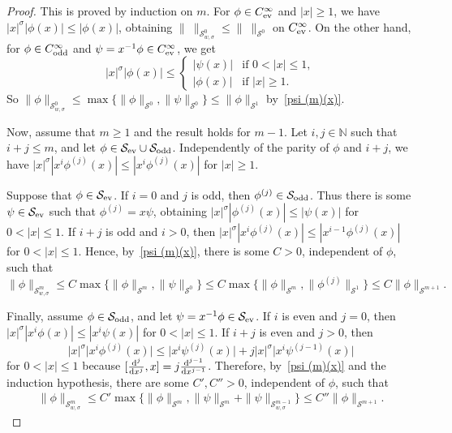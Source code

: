 \documentclass[pdftex]{sigma}
\newcommand{\N}{\mathbb{N}}
\renewcommand{\SS}{\mathcal{S}}
\newcommand{\Cinf}{C^\infty}
\begin{document}
\begin{proof}
  This is proved by induction on $m$. For $\phi\in C^\infty_{\text{\rm ev}}$ and $|x|\ge1$, we have $|x|^\sigma |\phi(x)|\le|\phi(x)|$, obtaining $\|\ \|_{\SS_{w,\sigma}^0}\le\|\ \|_{\SS^0}$ on $\Cinf_{\text{\rm ev}}$. On the other hand, for $\phi\in\Cinf_{\text{\rm odd}}$ and $\psi=x^{-1}\phi\in\Cinf_{\text{\rm ev}}$, we get{\samepage
    \[
      |x|^\sigma|\phi(x)|\le
        \begin{cases}
          |\psi(x)| & \text{if $0<|x|\le1$},\\
          |\phi(x)| & \text{if $|x|\ge1$} .
        \end{cases}
    \]
  So $\|\phi\|_{\SS_{w,\sigma}^0}\le\max\{\|\phi\|_{\SS^0},\|\psi\|_{\SS^0}\}\le\|\phi\|_{\SS^1}$ by~\eqref{psi (m)(x)}.}

  Now, assume that $m\ge1$ and the result holds for $m-1$. Let $i,j\in\N$ such that $i+j\le m$, and let $\phi\in\SS_{\text{\rm ev}}\cup\SS_{\text{\rm odd}}$. Independently of the parity of $\phi$ and $i+j$, we have $|x|^\sigma |x^i\phi^{(j)}(x)|\le|x^i\phi^{(j)}(x)|$ for $|x|\ge1$.

  Suppose that $\phi\in\SS_{\text{\rm ev}}$. If $i=0$ and $j$ is odd, then $\phi^{(j)}\in\SS_{\text{\rm odd}}$. Thus there is some $\psi\in\SS_{\text{\rm ev}}$ such that $\phi^{(j)}=x\psi$, obtaining $|x|^\sigma|\phi^{(j)}(x)|\le|\psi(x)|$ for $0<|x|\le1$. If $i+j$ is odd and $i>0$, then $|x|^\sigma|x^i\phi^{(j)}(x)|\le|x^{i-1}\phi^{(j)}(x)|$ for $0<|x|\le1$. Hence, by~\eqref{psi (m)(x)}, there is some $C>0$, independent of $\phi$, such that
    \[
      \|\phi\|_{\SS_{w,\sigma}^m}\le C\max\{\|\phi\|_{\SS^m},\|\psi\|_{\SS^0}\}\le C\max\bigl\{\|\phi\|_{\SS^m},\|\phi^{(j)}\|_{\SS^1}\bigr\}\le C \|\phi\|_{\SS^{m+1}} .
    \]

  Finally, assume $\phi\in\SS_{\text{\rm odd}}$, and let $\psi=x^{-1}\phi\in\SS_{\text{\rm ev}}$. If $i$ is even and $j=0$, then $|x|^\sigma |x^i\phi(x)|\le|x^i\psi(x)|$ for $0<|x|\le1$. If $i+j$ is even and $j>0$, then
    \[
      |x|^\sigma\big|x^i\phi^{(j)}(x)\big|\le\big|x^i\psi^{(j)}(x)\big|+j |x|^\sigma\big|x^i\psi^{(j-1)}(x)\big|
    \]
  for $0<|x|\le1$ because $[\frac{{\rm d}^j}{{\rm d}x^j},x]=j \frac{{\rm d}^{j-1}}{{\rm d}x^{j-1}}$. Therefore, by~\eqref{psi (m)(x)} and the induction hypothesis, there are some $C',C''>0$, independent of $\phi$, such that
    \begin{gather*}
      \|\phi\|_{\SS_{w,\sigma}^m}\le C'\max\bigl\{\|\phi\|_{\SS^m},\|\psi\|_{\SS^m}+\|\psi\|_{\SS_{w,\sigma}^{m-1}}\bigr\}\le C'' \|\phi\|_{\SS^{m+1}} .
\tag*{\qed}
    \end{gather*}
\renewcommand{\qed}{}
\end{proof}
\end{document}
